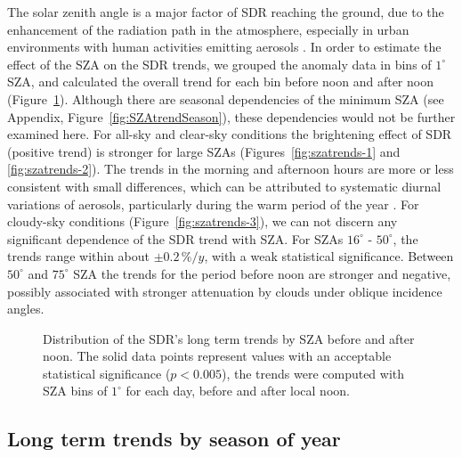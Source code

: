 \documentclass[applsci,article,submit,moreauthors,pdftex]{Definitions/mdpi}
\begin{document}
The solar zenith angle is a major factor of SDR reaching the ground, due
to the enhancement of the radiation path in the atmosphere, especially
in urban environments with human activities emitting aerosols
\citep{Wang2021}. In order to estimate the effect of the SZA on the SDR
trends, we grouped the anomaly data in bins of \(1^\circ\) SZA, and
calculated the overall trend for each bin before noon and after noon
(Figure~\ref{fig:szatrends}). Although there are seasonal dependencies
of the minimum SZA (see Appendix, Figure~\ref{fig:SZAtrendSeason}),
these dependencies would not be further examined here. For all-sky and
clear-sky conditions the brightening effect of SDR (positive trend) is
stronger for large SZAs (Figures~\ref{fig:szatrends-1} and
\ref{fig:szatrends-2}). The trends in the morning and afternoon hours
are more or less consistent with small differences, which can be
attributed to systematic diurnal variations of aerosols, particularly
during the warm period of the year \citep{Wang2021}. For cloudy-sky
conditions (Figure~\ref{fig:szatrends-3}), we can not discern any
significant dependence of the SDR trend with SZA. For SZAs \(16^\circ\)
- \(50^\circ\), the trends range within about \(\pm 0.2\,\%/y\), with a
weak statistical significance. Between \(50^\circ\) and \(75^\circ\) SZA
the trends for the period before noon are stronger and negative,
possibly associated with stronger attenuation by clouds under oblique
incidence angles.

\begin{figure}[h!]

{\centering {}

}

\caption{Distribution of the SDR's long term trends by SZA before and after noon. The solid data points represent values with an acceptable statistical significance ($p<0.005$), the trends were computed with SZA bins of $1^\circ$ for each day, before and after local noon.}\label{fig:szatrends}
\end{figure}

\hypertarget{long-term-trends-by-season-of-year}{%
\subsection{Long term trends by season of
year}\label{long-term-trends-by-season-of-year}}
\end{document}
